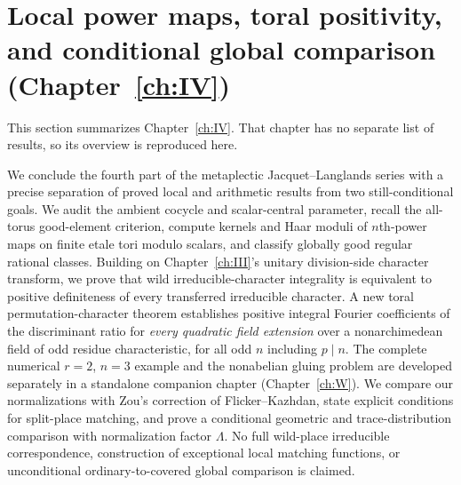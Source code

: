 \section{\texorpdfstring{Local power maps, toral positivity, and conditional global comparison (Chapter~\ref{ch:IV})}{Local power maps, toral positivity, and conditional global comparison (Chapter 7)}}\label{IV:sec:summary}
This section summarizes Chapter~\ref{ch:IV}. That chapter has no separate list of results, so its overview is reproduced here.

We conclude the fourth part of the metaplectic Jacquet--Langlands
series with a precise separation of proved local and arithmetic
results from two still-conditional goals.  We audit the ambient
cocycle and scalar-central parameter, recall the all-torus
good-element criterion, compute kernels and Haar moduli of
$n$th-power maps on finite etale tori modulo scalars, and
classify globally good regular rational classes.  Building on
Chapter~\ref{ch:III}'s unitary division-side character transform, we prove
that wild irreducible-character integrality is equivalent to
positive definiteness of every transferred irreducible character.
A new toral permutation-character theorem establishes positive
integral Fourier coefficients of the discriminant ratio for
\emph{every quadratic field extension} over a nonarchimedean
field of odd residue characteristic, for all odd $n$ including
$p\mid n$.  The complete numerical $r=2$, $n=3$ example and the
nonabelian gluing problem are developed separately in a
standalone companion chapter (Chapter~\ref{ch:W}).  We compare
our normalizations with Zou's correction of Flicker--Kazhdan,
state explicit conditions for split-place matching, and prove
a conditional geometric and trace-distribution comparison with
normalization factor $\Lambda$.  No full wild-place irreducible
correspondence, construction of exceptional local matching
functions, or unconditional ordinary-to-covered global
comparison is claimed.

